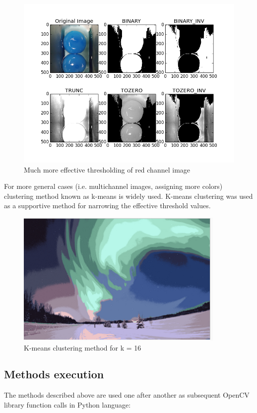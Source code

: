 \documentclass[12pt,twoside,a4paper]{article}
\begin{document}
\begin{figure}[H]
\centering
\includegraphics[width=0.6\paperwidth]{red}
\caption{Much more effective thresholding of red channel image}\label{fig:red}
\end{figure}

For more general cases (i.e. multichannel images, assigning more colors) clustering method known as k-means is widely used.\cite{lesscv} K-means clustering was used as a supportive method for narrowing the effective threshold values.
 
\begin{figure}[H]
\centering
\includegraphics[width=0.4\paperwidth]{kmeans}
\caption{K-means clustering method for k = 16\cite{segm}}\label{fig:kmeans}
\end{figure}
\subsection{Methods execution}
The methods described above are used one after another as subsequent OpenCV library function calls in Python language:

\end{document}
